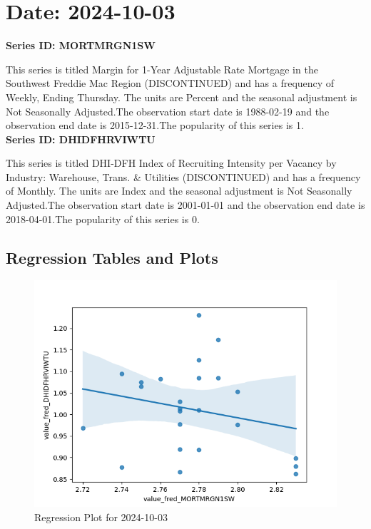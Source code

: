 \section{Date: 2024-10-03}
\noindent \textbf{Series ID: MORTMRGN1SW} 

\noindent This series is titled Margin for 1-Year Adjustable Rate Mortgage in the Southwest Freddie Mac Region (DISCONTINUED) and has a frequency of Weekly, Ending Thursday. The units are Percent and the seasonal adjustment is Not Seasonally Adjusted.The observation start date is 1988-02-19 and the observation end date is 2015-12-31.The popularity of this series is 1. \\ 

\noindent \textbf{Series ID: DHIDFHRVIWTU} 

\noindent This series is titled DHI-DFH Index of Recruiting Intensity per Vacancy by Industry: Warehouse, Trans. \& Utilities (DISCONTINUED) and has a frequency of Monthly. The units are Index and the seasonal adjustment is Not Seasonally Adjusted.The observation start date is 2001-01-01 and the observation end date is 2018-04-01.The popularity of this series is 0. \\ 

\subsection{Regression Tables and Plots}


\begin{figure}
\centering
\includegraphics[scale = 0.9]{plots/plot_2024-10-03.png}
\caption{Regression Plot for 2024-10-03}
\end{figure}
\newpage
